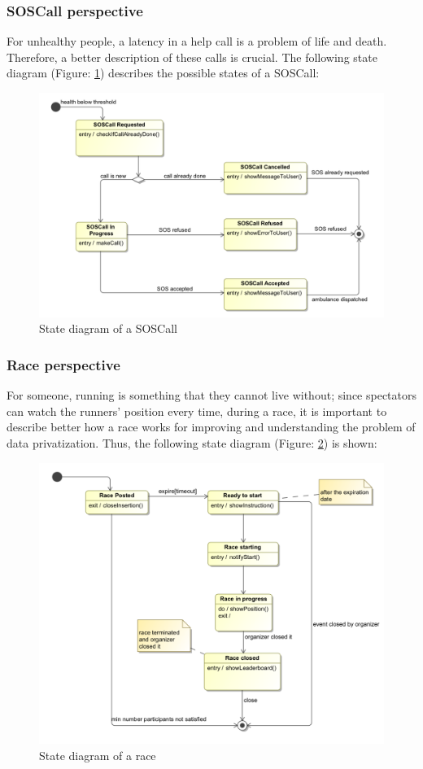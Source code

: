\subsubsection{SOSCall perspective}
For unhealthy people, a latency in a help call is a problem of life and death. Therefore, a better 
description of these calls is crucial. The following state diagram (Figure: \ref{fig:sosdiagram}) 
describes the possible states of a SOSCall:

\begin{figure}[H]
\includegraphics[width=0.8\linewidth]{Images/sosdiagram}
\caption{State diagram of a SOSCall}
\label{fig:sosdiagram}
\end{figure}

\subsubsection{Race perspective}
For someone, running is something that they cannot live without; since spectators can watch the runners' position every time, during a race, it is important to describe better how a race works for improving and understanding the problem of  data privatization. 
Thus, the following state diagram (Figure: \ref{fig:racediagram}) is shown: 

\begin{figure}[H]
\includegraphics[width=0.8\linewidth]{Images/racediagram}
\caption{State diagram of a race}
\label{fig:racediagram}
\end{figure}
